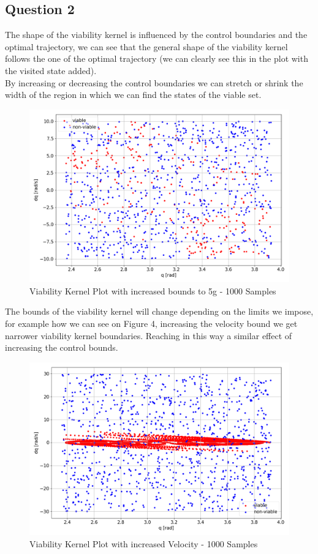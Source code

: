 \documentclass[12pt]{article}
\begin{document}
\subsection*{Question 2}
The shape of the viability kernel is influenced by the control boundaries and the optimal trajectory, we can see that the general shape of the viability kernel follows the one of the optimal trajectory (we can clearly see this in the plot with the visited state added).\\
By increasing or decreasing the control boundaries we can stretch or shrink the width of the region in which we can find the states of the viable set.\\
\begin{figure}[h!]
    \centering
    \includegraphics[width=0.5\linewidth]{ViabilityKernelPlot5gcontrolbounds.png}
    \caption{Viability Kernel Plot with increased bounds to 5g - 1000 Samples}\label{fig:oscvsic}
\end{figure}
The bounds of the viability kernel will change depending on the limits we impose, for example how we can see on Figure 4, increasing the velocity bound we get narrower viability kernel boundaries. Reaching in this way a similar effect of increasing the control bounds.


\begin{figure}[h!]
    \centering
    \includegraphics[width=0.5\linewidth]{ViabilityKernelWithIncreasedVelocityBound.png}
    \caption{Viability Kernel Plot with increased Velocity - 1000 Samples}\label{fig:oscvsic}
\end{figure}
\end{document}

